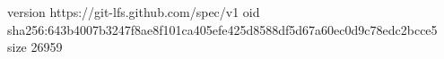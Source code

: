 version https://git-lfs.github.com/spec/v1
oid sha256:643b4007b3247f8ae8f101ca405efe425d8588df5d67a60ec0d9c78edc2bcce5
size 26959
